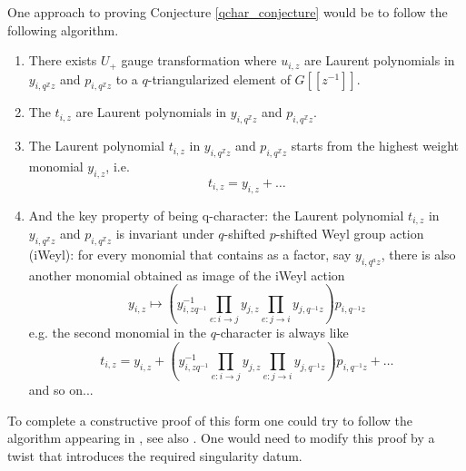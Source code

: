 \documentclass[11pt, oneside, reqno]{amsart}
\theoremstyle{definition} \newtheorem{definition}{Definition}[section]
\theoremstyle{definition} \newtheorem{remark}[definition]{Remark}
\theoremstyle{definition} \newtheorem{remarks}[definition]{Remarks}
\theoremstyle{definition} \newtheorem{question}[definition]{Question}
\theoremstyle{definition} \newtheorem*{note}{Note}
\theoremstyle{definition} \newtheorem{example}[definition]{Example}
\theoremstyle{definition} \newtheorem{examples}[definition]{Examples}
\newcommand{\chris}[1]{(\textcolor{red}{Chris: #1})}
\begin{document}
One approach to proving Conjecture \ref{qchar_conjecture} would be to follow the following algorithm.
\begin{enumerate}
\chris{todo: edit for consistency}
 \item There exists $U_{+}$ gauge transformation 
where $u_{i,z}$ are Laurent polynomials in $y_{i,q^{\mathbb{Z}} z}$
and $p_{i, q^{\mathbb{Z}} z}$ to a $q$-triangularized element of $G[[z^{-1}]]$.

\item The $t_{i,z}$ are Laurent polynomials in $y_{i,q^{\mathbb{Z}} z}$
and $p_{i, q^{\mathbb{Z}} z}$.

\item The Laurent polynomial $t_{i,z}$  in $y_{i,q^{\mathbb{Z}} z}$
and $p_{i, q^{\mathbb{Z}} z}$ starts from the highest weight monomial $y_{i,z}$, i.e. 
\begin{equation*}
  t_{i,z} = y_{i,z} + \dots 
\end{equation*}

\item And the key property of being q-character:
the Laurent polynomial $t_{i,z}$ in  $y_{i,q^{\mathbb{Z}} z}$
and $p_{i, q^{\mathbb{Z}} z}$ is invariant under $q$-shifted $p$-shifted Weyl group action (iWeyl): for every monomial that contains as
a factor, say $y_{i,q^{a} z}$, there is also
another monomial obtained as image of the iWeyl action
\begin{equation*}
    y_{i,z} \mapsto    (y_{i, z q^{-1}}^{-1} \prod_{e: i \to j} y_{j, z} \prod_{e: j\to i} y_{j,q^{-1} z})  p_{i, q^{-1} z} 
  \end{equation*}
e.g. the second monomial in the $q$-character is always like 
  \begin{equation*}
  t_{i,z} = y_{i,z} + (y_{i, z q^{-1}}^{-1} \prod_{e: i \to j} y_{j, z} \prod_{e: j\to i} y_{j,q^{-1} z})  p_{i, q^{-1} z}  + \dots 
  \end{equation*}
and so on...
  
\end{enumerate}

To complete a constructive proof of this form one could try to follow the algorithm appearing in \cite[Page 11-12]{STSSevostyanov},   see also \cite{Sevostyanov1}.  One would need to modify this proof by a twist that introduces the required singularity datum.
\end{document}
